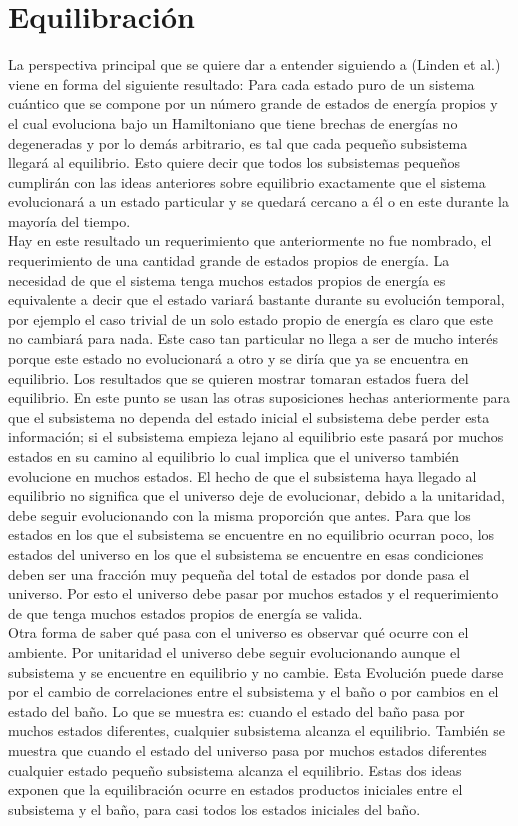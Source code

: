 \section{Equilibración}

La perspectiva principal que se quiere dar a entender siguiendo a (Linden et al.) viene en forma del siguiente resultado: Para cada estado puro de un sistema cuántico que se compone por un número grande de estados de energía propios y el cual evoluciona bajo un Hamiltoniano que tiene brechas de energías no degeneradas y por lo demás arbitrario, es tal que cada pequeño subsistema llegará al equilibrio. Esto quiere decir que todos los subsistemas pequeños cumplirán con las ideas anteriores sobre equilibrio exactamente que el sistema evolucionará a un estado particular y se quedará cercano a él o en este durante la mayoría del tiempo.
\\
Hay en este resultado un requerimiento que anteriormente no fue nombrado, el requerimiento de una cantidad grande de estados propios de energía. La necesidad de que el sistema tenga muchos estados propios de energía es equivalente a decir que el estado variará bastante durante su evolución temporal, por ejemplo el caso trivial de un solo estado propio de energía es claro que este no cambiará para nada. Este caso tan particular no llega a ser de mucho interés porque este estado no evolucionará a otro y se diría que ya se encuentra en equilibrio. Los resultados que se quieren mostrar tomaran estados fuera del equilibrio. En este punto se usan las otras suposiciones hechas anteriormente para que el subsistema no dependa del estado inicial el subsistema debe perder esta información; si el subsistema empieza lejano al equilibrio este pasará  por muchos estados en su camino al equilibrio lo cual implica que el universo también evolucione en muchos estados. El hecho de que el subsistema haya llegado al equilibrio no significa que el universo deje de evolucionar, debido a la unitaridad, debe seguir evolucionando con la misma proporción que antes. Para que los estados en los que el subsistema se encuentre en no equilibrio ocurran poco, los estados del universo en los que el subsistema se encuentre en esas condiciones deben ser una fracción muy pequeña del total de estados por donde pasa el universo. Por esto el universo debe pasar por muchos estados y el requerimiento de que tenga muchos estados propios de energía se valida. 
\\
Otra forma de saber qué pasa con el universo es observar qué ocurre con el ambiente. Por unitaridad el universo debe seguir evolucionando aunque el subsistema y se encuentre en equilibrio y no cambie. Esta Evolución puede darse por el cambio de correlaciones entre el subsistema y el baño o por cambios en el estado del baño. Lo que se muestra es: cuando el estado del baño pasa por muchos estados diferentes, cualquier subsistema alcanza el equilibrio. También se muestra que cuando el estado del universo pasa por muchos estados diferentes cualquier estado pequeño subsistema alcanza el equilibrio. Estas dos ideas  exponen que la equilibración ocurre en estados productos iniciales entre el subsistema y el baño, para casi todos los estados iniciales del baño.
\\

